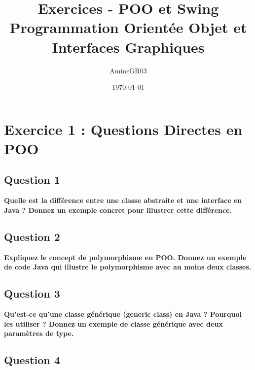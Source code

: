 \documentclass[11pt,a4paper]{article}
\title{Exercices - POO et Swing\\
\large Programmation Orientée Objet et Interfaces Graphiques}
\author{AmineGR03}
\date{\today}
\begin{document}
\maketitle

\tableofcontents
\newpage

\section{Exercice 1 : Questions Directes en POO}

\subsection{Question 1}

\textbf{Quelle est la différence entre une classe abstraite et une interface en Java ? Donnez un exemple concret pour illustrer cette différence.}

\begin{reponsebox}
\vspace{3cm}
\end{reponsebox}

\subsection{Question 2}

\textbf{Expliquez le concept de polymorphisme en POO. Donnez un exemple de code Java qui illustre le polymorphisme avec au moins deux classes.}

\begin{reponsebox}
\vspace{4cm}
\end{reponsebox}

\subsection{Question 3}

\textbf{Qu'est-ce qu'une classe générique (generic class) en Java ? Pourquoi les utiliser ? Donnez un exemple de classe générique avec deux paramètres de type.}

\begin{reponsebox}
\vspace{4cm}
\end{reponsebox}

\subsection{Question 4}
\end{document}
